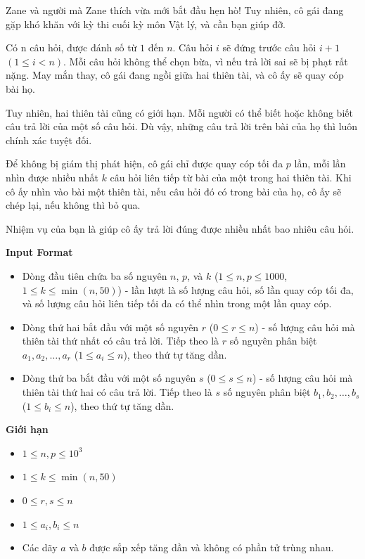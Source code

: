 \documentclass{article}
\begin{document}
\begin{tcolorbox}[
    colback=blue!5,        %
    colframe=blue!75!black,%
    title={Đề bài}
]
Zane và người mà Zane thích vừa mới bắt đầu hẹn hò! Tuy nhiên, cô gái đang gặp khó khăn với kỳ thi cuối kỳ môn Vật lý, và cần bạn giúp đỡ.

Có n câu hỏi, được đánh số từ $1$ đến $n$. Câu hỏi $i$ sẽ đứng trước câu hỏi $i + 1$ $(1 \leq i < n)$. Mỗi câu hỏi không thể chọn bừa, vì nếu trả lời sai sẽ bị phạt rất nặng. May mắn thay, cô gái đang ngồi giữa hai thiên tài, và cô ấy sẽ quay cóp bài họ.

Tuy nhiên, hai thiên tài cũng có giới hạn. Mỗi người có thể biết hoặc không biết câu trả lời của một số câu hỏi. Dù vậy, những câu trả lời trên bài của họ thì luôn chính xác tuyệt đối.

Để không bị giám thị phát hiện, cô gái chỉ được quay cóp tối đa $p$ lần, mỗi lần nhìn được nhiều nhất $k$ câu hỏi liên tiếp từ bài của một trong hai thiên tài. Khi cô ấy nhìn vào bài một thiên tài, nếu câu hỏi đó có trong bài của họ, cô ấy sẽ chép lại, nếu không thì bỏ qua.

Nhiệm vụ của bạn là giúp cô ấy trả lời đúng được nhiều nhất bao nhiêu câu hỏi.
\end{tcolorbox}

\textbf{Input Format}

\begin{itemize}
    \item Dòng đầu tiên chứa ba số nguyên $n$, $p$, và $k$ ($1 \leq n, p \leq 1000$, $1 \leq k \leq \min(n, 50)$) - lần lượt là số lượng câu hỏi, số lần quay cóp tối đa, và số lượng câu hỏi liên tiếp tối đa có thể nhìn trong một lần quay cóp.
    \item Dòng thứ hai bắt đầu với một số nguyên $r$ ($0 \leq r \leq n$) - số lượng câu hỏi mà thiên tài thứ nhất có câu trả lời. Tiếp theo là $r$ số nguyên phân biệt $a_1, a_2, \dots, a_r$ ($1 \leq a_i \leq n$), theo thứ tự tăng dần.
    \item Dòng thứ ba bắt đầu với một số nguyên $s$ ($0 \leq s \leq n$) - số lượng câu hỏi mà thiên tài thứ hai có câu trả lời. Tiếp theo là $s$ số nguyên phân biệt $b_1, b_2, \dots, b_s$ ($1 \leq b_i \leq n$), theo thứ tự tăng dần.
\end{itemize}

\textbf{Giới hạn}
\begin{itemize}
    \item $1 \leq n, p \leq 10^3$
    \item $1 \leq k \leq \min(n, 50)$
    \item $0 \leq r, s \leq n$
    \item $1 \leq a_i, b_i \leq n$
    \item Các dãy $a$ và $b$ được sắp xếp tăng dần và không có phần tử trùng nhau.
\end{itemize}
\end{document}
